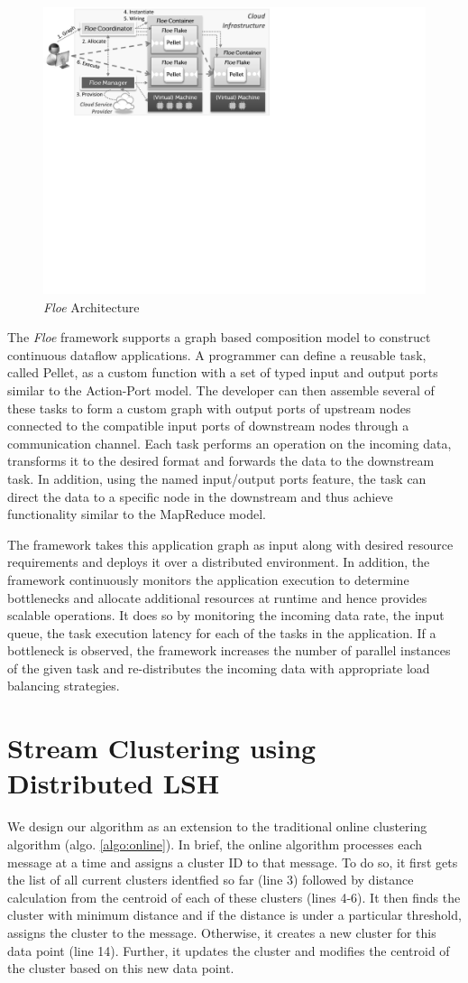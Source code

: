 \documentclass{article} %
\newcommand{\floe}{\emph{Floe }}
\begin{document}
\begin{figure}
\centering
\includegraphics[width=0.5\columnwidth]{floe_arch}
\caption{\floe Architecture}
\label{fig:floe_arch}
\end{figure}

The \floe framework supports a graph based composition model to construct continuous dataflow applications. A programmer can define a reusable task, called Pellet, as a custom function with a set of typed input and output ports similar to the Action-Port model. The developer can then assemble several of these tasks to form a custom graph with output ports of upstream nodes connected to the compatible input ports of downstream nodes through a communication channel. Each task performs an operation on the incoming data, transforms it to the desired format and forwards the data to the downstream task. In addition, using the named input/output ports feature, the task can direct the data to a specific node in the downstream and thus achieve functionality similar to the MapReduce model.

The framework takes this application graph as input along with desired resource requirements and deploys it over a distributed environment. In addition, the framework continuously monitors the application execution to determine bottlenecks and allocate additional resources at runtime and hence provides scalable operations. It does so by monitoring the incoming data rate, the input queue, the task execution latency for each of the tasks in the application. If a bottleneck is observed, the framework increases the number of parallel instances of the given task and re-distributes the incoming data with appropriate load balancing strategies.


\section{Stream Clustering using Distributed LSH}
\label{sec:design}

We design our algorithm as an extension to the traditional online clustering algorithm (algo. \ref{algo:online}). In brief, the online algorithm processes each message at a time and assigns a cluster ID to that message. To do so, it first gets the list of all current clusters identfied so far (line 3) followed by distance calculation from the centroid of each of these clusters (lines 4-6). It then finds the cluster with minimum distance and if the distance is under a particular threshold, assigns the cluster to the message. Otherwise, it creates a new cluster for this data point (line 14). Further, it updates the cluster and modifies the centroid of the cluster based on this new data point. 
\end{document}
